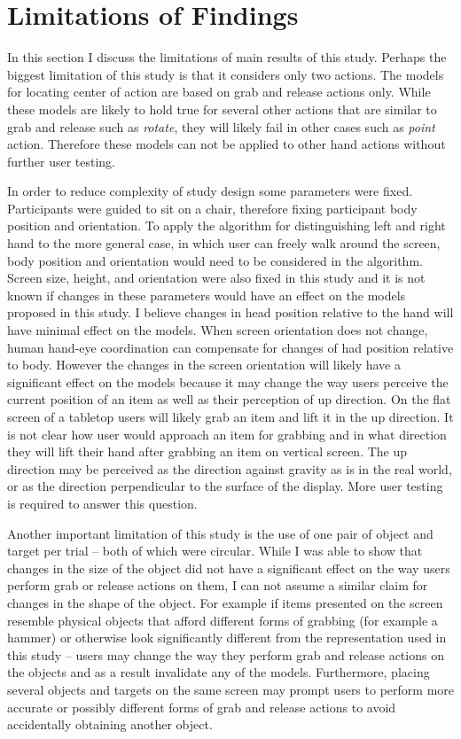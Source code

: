 \section{Limitations of Findings}
In this section I discuss the limitations of main results of this study.
Perhaps the biggest limitation of this study is that it considers only two actions.
The models for locating center of action are based on grab and release actions only.
While these models are likely to hold true for several other actions that are similar to grab and release such as \textit{rotate}, they will likely fail in other cases such as \textit{point} action.
Therefore these models can not be applied to other hand actions without further user testing.

In order to reduce complexity of study design some parameters were fixed.
Participants were guided to sit on a chair, therefore fixing participant body position and orientation.
To apply the algorithm for distinguishing left and right hand to the more general case, in which user can freely walk around the screen, body position and orientation would need to be considered in the algorithm.
Screen size, height, and orientation were also fixed in this study and it is not known if changes in these parameters would have an effect on the models proposed in this study.
I believe changes in head position relative to the hand will have minimal effect on the models.
When screen orientation does not change, human hand-eye coordination can compensate for changes of had position relative to body.
However the changes in the screen orientation will likely have a significant effect on the models because it may change the way users perceive the current position of an item as well as their perception of up direction.
On the flat screen of a tabletop users will likely grab an item and lift it in the up direction.
It is not clear how user would approach an item for grabbing and in what direction they will lift their hand after grabbing an item on vertical screen.
The up direction may be perceived as the direction against gravity as is in the real world, or as the direction perpendicular to the surface of the display.
More user testing is required to answer this question.

Another important limitation of this study is the use of one pair of object and target per trial -- both of which were circular.
While I was able to show that changes in the size of the object did not have a significant effect on the way users perform grab or release actions on them, I can not assume a similar claim for changes in the shape of the object.
For example if items presented on the screen resemble physical objects that afford different forms of grabbing (for example a hammer) or otherwise look significantly different from the representation used in this study -- users may change the way they perform grab and release actions on the objects and as a result invalidate any of the models.
Furthermore, placing several objects and targets on the same screen may prompt
users to perform more accurate or possibly different forms of grab and release
actions to avoid accidentally obtaining another object.

